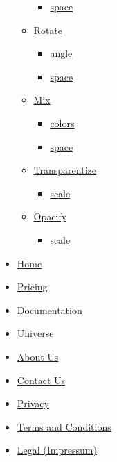 \begin{itemize}
\begin{itemize}
    \begin{itemize}
    \tightlist
    \item
      \hyperref[definitions-negate-space]{space}
    \end{itemize}
  \item
    \hyperref[definitions-rotate]{Rotate}

    \begin{itemize}
    \tightlist
    \item
      \hyperref[definitions-rotate-angle]{angle}
    \item
      \hyperref[definitions-rotate-space]{space}
    \end{itemize}
  \item
    \hyperref[definitions-mix]{Mix}

    \begin{itemize}
    \tightlist
    \item
      \hyperref[definitions-mix-colors]{colors}
    \item
      \hyperref[definitions-mix-space]{space}
    \end{itemize}
  \item
    \hyperref[definitions-transparentize]{Transparentize}

    \begin{itemize}
    \tightlist
    \item
      \hyperref[definitions-transparentize-scale]{scale}
    \end{itemize}
  \item
    \hyperref[definitions-opacify]{Opacify}

    \begin{itemize}
    \tightlist
    \item
      \hyperref[definitions-opacify-scale]{scale}
    \end{itemize}
  \end{itemize}
\end{itemize}

\begin{itemize}
\tightlist
\item
  \href{/}{Home}
\item
  \href{/pricing/}{Pricing}
\item
  \href{/docs/}{Documentation}
\item
  \href{/universe/}{Universe}
\item
  \href{/about/}{About Us}
\item
  \href{/contact/}{Contact Us}
\item
  \href{/privacy/}{Privacy}
\item
  \href{https://typst.app/terms}{Terms and Conditions}
\item
  \href{/legal/}{Legal (Impressum)}
\end{itemize}

